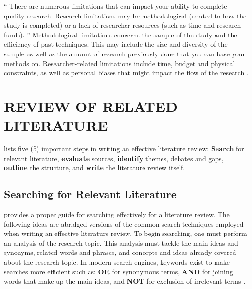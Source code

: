 \documentclass{strrespaper-trad}
\begin{document}
			\enquote{%
				There are numerous limitations that can impact your ability to complete quality research.
				Research limitations may be methodological (related to how the study is completed) or a lack of researcher resources (such as time and research funds).%
			}
			Methodological limitations concerns the sample of the study and the efficiency of past techniques. This may include the size and diversity of the sample as well as the amount of research previously done that you can base your methods on.
			Researcher-related limitations include time, budget and physical constraints, as well as personal biases that might impact the flow of the research \autocite{askmediagroupWhatAreScope2020}.


	\chapter{REVIEW OF RELATED LITERATURE}
		\textcite{mccombesLiteratureReviewComplete2019} lists five (5) important steps in writing an effective literature review: \textbf{Search} for relevant literature, \textbf{evaluate} sources, \textbf{identify} themes, debates and gaps, \textbf{outline} the structure, and \textbf{write} the literature review itself.

		\section*{Searching for Relevant Literature}
			\textcite{hardyGuidesLiteratureReview2020} provides a proper guide for searching effectively for a literature review.
			The following ideas are abridged versions of the common search techniques employed when writing an effective literature review.
			To begin searching, one must perform an analysis of the research topic.
			This analysis must tackle the main ideas and synonyms, related words and phrases, and concepts and ideas already covered about the research topic.
			In modern search engines, keywords exist to make searches more efficient such as: \textbf{OR} for synonymous terms, \textbf{AND} for joining words that make up the main ideas, and \textbf{NOT} for exclusion of irrelevant terms \autocite{hardyGuidesLiteratureReview2020}.
\end{document}
